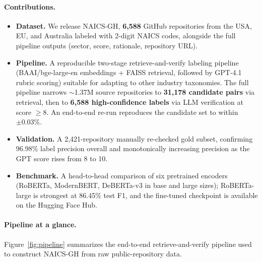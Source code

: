 \documentclass{article}
\begin{document}
\paragraph{Contributions.}
\begin{itemize}
  \item \textbf{Dataset.} We release NAICS-GH, \textbf{6{,}588} GitHub
    repositories from the USA, EU, and Australia labeled with 2-digit
    NAICS codes, alongside the full pipeline outputs (sector, score,
    rationale, repository URL).
  \item \textbf{Pipeline.} A reproducible two-stage retrieve-and-verify
    labeling pipeline (BAAI/bge-large-en embeddings + FAISS
    retrieval, followed by GPT-4.1 rubric scoring) suitable for
    adapting to other industry taxonomies. The full pipeline narrows
    $\sim$1.37M source repositories to \textbf{31{,}178 candidate
    pairs} via retrieval, then to \textbf{6{,}588 high-confidence
    labels} via LLM verification at score $\geq 8$. An end-to-end
    re-run reproduces the candidate set to within $\pm 0.03\%$.
  \item \textbf{Validation.} A 2{,}421-repository manually re-checked
    gold subset, confirming 96.98\% label precision overall and
    monotonically increasing precision as the GPT score rises from 8 to
    10.
  \item \textbf{Benchmark.} A head-to-head comparison of six
    pretrained encoders (RoBERTa, ModernBERT, DeBERTa-v3 in base and
    large sizes); RoBERTa-large is strongest at 86.45\% test F1, and
    the fine-tuned checkpoint is available on the Hugging Face Hub.
\end{itemize}

\paragraph{Pipeline at a glance.} Figure~\ref{fig:pipeline} summarizes
the end-to-end retrieve-and-verify pipeline used to construct
NAICS-GH from raw public-repository data.
\end{document}
